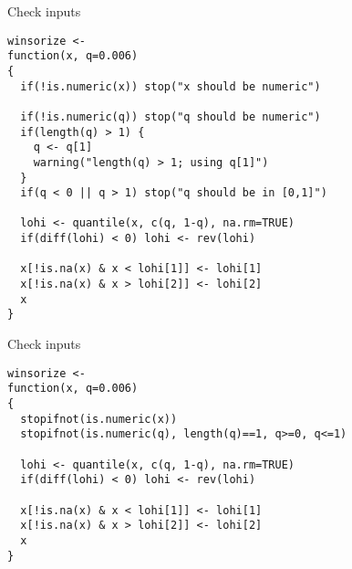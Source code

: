 \documentclass[aspectratio=169,12pt,t]{beamer}
\begin{document}
\begin{frame}[c,fragile]{Check inputs}


\begin{lstlisting}
winsorize <-
function(x, q=0.006)
{
  if(!is.numeric(x)) stop("x should be numeric")

  if(!is.numeric(q)) stop("q should be numeric")
  if(length(q) > 1) {
    q <- q[1]
    warning("length(q) > 1; using q[1]")
  }
  if(q < 0 || q > 1) stop("q should be in [0,1]")

  lohi <- quantile(x, c(q, 1-q), na.rm=TRUE)
  if(diff(lohi) < 0) lohi <- rev(lohi)

  x[!is.na(x) & x < lohi[1]] <- lohi[1]
  x[!is.na(x) & x > lohi[2]] <- lohi[2]
  x
}
\end{lstlisting}


\end{frame}




\begin{frame}[c,fragile]{Check inputs}


\begin{lstlisting}
winsorize <-
function(x, q=0.006)
{
  stopifnot(is.numeric(x))
  stopifnot(is.numeric(q), length(q)==1, q>=0, q<=1)

  lohi <- quantile(x, c(q, 1-q), na.rm=TRUE)
  if(diff(lohi) < 0) lohi <- rev(lohi)

  x[!is.na(x) & x < lohi[1]] <- lohi[1]
  x[!is.na(x) & x > lohi[2]] <- lohi[2]
  x
}
\end{lstlisting}


\end{frame}
\end{document}
